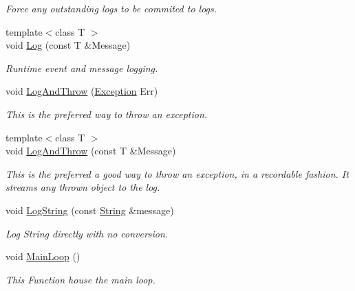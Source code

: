 \begin{DoxyCompactItemize}
\begin{DoxyCompactList}\small\item\em Force any outstanding logs to be commited to logs. \item\end{DoxyCompactList}\item 
{\footnotesize template$<$class T $>$ }\\void \hyperlink{classphys_1_1World_a4ab573bc3b060d6b3f58483bab04fca2}{Log} (const T \&Message)
\begin{DoxyCompactList}\small\item\em Runtime event and message logging. \item\end{DoxyCompactList}\item 
void \hyperlink{classphys_1_1World_a372ee96d395d735531f755fc0a72de4a}{LogAndThrow} (\hyperlink{classphys_1_1Exception}{Exception} Err)
\begin{DoxyCompactList}\small\item\em This is the preferred way to throw an exception. \item\end{DoxyCompactList}\item 
{\footnotesize template$<$class T $>$ }\\void \hyperlink{classphys_1_1World_a4bc9fb3942b6c1cf216bd356a1b6332b}{LogAndThrow} (const T \&Message)
\begin{DoxyCompactList}\small\item\em This is the preferred a good way to throw an exception, in a recordable fashion. It streams any thrown object to the log. \item\end{DoxyCompactList}\item 
void \hyperlink{classphys_1_1World_abf6cb15d85be4e7dcb99db24f979319b}{LogString} (const \hyperlink{namespacephys_aa03900411993de7fbfec4789bc1d392e}{String} \&message)
\begin{DoxyCompactList}\small\item\em Log String directly with no conversion. \item\end{DoxyCompactList}\item 
void \hyperlink{classphys_1_1World_af1d9e36d43f5e50543fa2351a32c8362}{MainLoop} ()
\begin{DoxyCompactList}\small\item\em This Function house the main loop. \item\end{DoxyCompactList}\item 

\end{DoxyCompactItemize}
